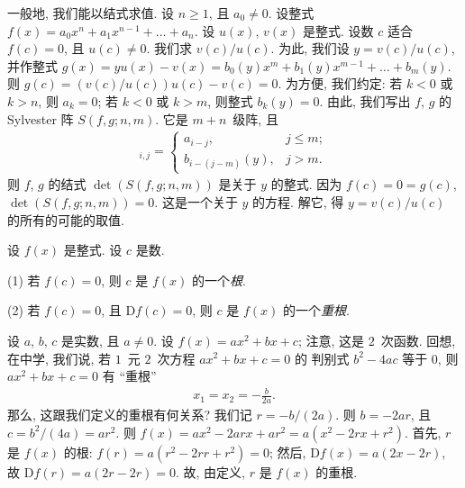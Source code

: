 \documentclass[../libro.tex]{subfiles}
\begin{document}
一般地, 我们能以结式求值.
设 \(n \geq 1\), 且 \(a_0 \neq 0\).
设整式 \(f(x) = a_0 x^n + a_1 x^{n-1} + \dots + a_n\).
设 \(u(x)\), \(v(x)\) 是整式.
设数 \(c\) 适合 \(f(c) = 0\),
且 \(u(c) \neq 0\).
我们求 \(v(c) / u(c)\).
为此, 我们设 \(y = v(c) / u(c)\),
并作整式
\(g(x) = y u(x) - v(x)
= b_0 (y) x^m + b_1 (y) x^{m-1} + \dots + b_m (y)\).
则 \(g(c) = (v(c) / u(c)) u(c) - v(c) = 0\).
为方便, 我们约定:
若 \(k < 0\) 或 \(k > n\), 则 \(a_k = 0\);
若 \(k < 0\) 或 \(k > m\), 则整式 \(b_k (y) = 0\).
由此, 我们写出 \(f\), \(g\) 的 Sylvester 阵
\(S(f, g; n, m)\).
它是 \(m + n\)~级阵, 且
\begin{align*}
    [S(f, g; n, m)]_{i,j} =
    \begin{cases}
        a_{i-j},         & j \leq m; \\
        b_{i-(j-m)} (y), & j > m.
    \end{cases}
\end{align*}
则 \(f\), \(g\) 的结式 \(\det {(S(f, g; n, m))}\)
是关于 \(y\) 的整式.
因为 \(f(c) = 0 = g(c)\),
\(\det {(S(f, g; n, m))} = 0\).
这是一个关于 \(y\) 的方程.
解它, 得 \(y = v(c) / u(c)\) 的所有的可能的取值.

\begin{definition}
    设 \(f(x)\) 是整式.
    设 \(c\) 是数.

    (1)
    若 \(f(c) = 0\), 则 \(c\) 是 \(f(x)\) 的一个\emph{根}.

    (2)
    若 \(f(c) = 0\), 且 \(\mathrm{D} f(c) = 0\),
    则 \(c\) 是 \(f(x)\) 的一个\emph{重根}.
\end{definition}

\begin{example}
    设 \(a\), \(b\), \(c\) 是实数, 且 \(a \neq 0\).
    设 \(f(x) = a x^2 + b x + c\);
    注意, 这是 \(2\)~次函数.
    回想, 在中学, 我们说,
    若 \(1\)~元 \(2\)~次方程
    \(a x^2 + b x + c = 0\) 的%
    判别式 \(b^2 - 4 a c\) 等于 \(0\),
    则 \(a x^2 + b x + c = 0\) 有 ``重根''
    \begin{align*}
        x_1 = x_2 = -\frac{b}{2a}.
    \end{align*}
    那么, 这跟我们定义的重根有何关系?
    我们记 \(r = -b/(2a)\).
    则 \(b = -2a r\),
    且 \(c = b^2 / (4a) = a r^2\).
    则 \(f(x) = a x^2 - 2 a r x + a r^2
    = a (x^2 - 2 r x + r^2)\).
    首先, \(r\) 是 \(f(x)\) 的根:
    \(f(r) = a (r^2 - 2 r r + r^2) = 0\);
    然后, \(\mathrm{D} f(x) = a (2 x - 2 r)\),
    故 \(\mathrm{D} f(r) = a (2 r - 2 r) = 0\).
    故, 由定义, \(r\) 是 \(f(x)\) 的重根.
\end{example}
\end{document}
